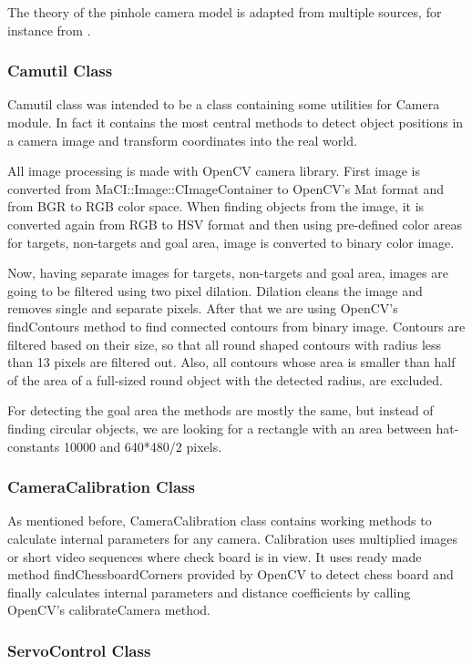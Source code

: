 \documentclass[a4paper,10pt]{article}
\begin{document}
The theory of the pinhole camera model is adapted from multiple sources, for instance from \cite{pinhole_cam}.

\subsubsection{Camutil Class}

Camutil class was intended to be a class containing some utilities for Camera module. In fact it contains the most central methods to detect object positions in a camera image and transform coordinates into the real world.

All image processing is made with OpenCV camera library. First image is converted from MaCI::Image::CImageContainer to OpenCV's Mat format and from BGR to RGB color space. When finding objects from the image, it is converted again from RGB to HSV format and then using pre-defined color areas for targets, non-targets and goal area, image is converted to binary color image.

Now, having separate images for targets, non-targets and goal area, images are going to be filtered using two pixel dilation. Dilation cleans the image and removes single and separate pixels. After that we are using OpenCV's findContours method to find connected contours from binary image. Contours are filtered based on their size, so that all round shaped contours with radius less than 13 pixels are filtered out. Also, all contours whose area is smaller than half of the area of a full-sized round object with the detected radius, are excluded.

For detecting the goal area the methods are mostly the same, but instead of finding circular objects, we are looking for a rectangle with an area between hat-constants 10000 and 640*480/2 pixels.

\subsubsection{CameraCalibration Class}

As mentioned before, CameraCalibration class contains working methods to calculate internal parameters for any camera. Calibration uses multiplied images or short video sequences where check board is in view. It uses ready made method findChessboardCorners provided by OpenCV to detect chess board and finally calculates internal parameters and distance coefficients by calling OpenCV's calibrateCamera method.

\subsubsection{ServoControl Class}
\label{servo}
\end{document}
